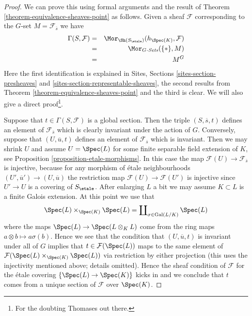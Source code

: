 \begin{proof}
We can prove this using formal arguments and the result of
Theorem \ref{theorem-equivalence-sheaves-point}
as follows. Given a sheaf $\mathcal{F}$ corresponding to
the $G$-set $M = \mathcal{F}_{\overline{s}}$ we have
\begin{eqnarray*}
\Gamma(S, \mathcal{F}) & = &
\Mor_{\Sh(S_\etale)}(h_{\Spec(K)},  \mathcal{F})
\\
& = & \Mor_{G\textit{-Sets}}(\{*\}, M) \\
& = & M^G
\end{eqnarray*}
Here the first identification is explained in
Sites, Sections \ref{sites-section-presheaves} and
\ref{sites-section-representable-sheaves},
the second results from
Theorem \ref{theorem-equivalence-sheaves-point}
and the third is clear. We will also give a direct proof\footnote{For
the doubting Thomases out there.}.

\medskip\noindent
Suppose that $t \in \Gamma(S, \mathcal{F})$ is a global section.
Then the triple $(S, \overline{s}, t)$ defines an element of
$\mathcal{F}_{\overline{s}}$ which is clearly invariant under the
action of $G$. Conversely, suppose that $(U, \overline{u}, t)$
defines an element of $\mathcal{F}_{\overline{s}}$ which is invariant.
Then we may shrink $U$ and assume $U = \Spec(L)$ for some
finite separable field extension of $K$, see
Proposition \ref{proposition-etale-morphisms}.
In this case the map $\mathcal{F}(U) \to \mathcal{F}_{\overline{s}}$
is injective, because for any morphism of \'etale neighbourhoods
$(U', \overline{u}') \to (U, \overline{u})$ the restriction map
$\mathcal{F}(U) \to \mathcal{F}(U')$ is injective since $U' \to U$
is a covering of $S_\etale$.
After enlarging $L$ a bit we may assume $K \subset L$ is a finite
Galois extension. At this point we use that
$$
\Spec(L) \times_{\Spec(K)} \Spec(L)
=
\coprod\nolimits_{\sigma \in \text{Gal}(L/K)} \Spec(L)
$$
where the maps $\Spec(L) \to \Spec(L \otimes_K L)$
come from the ring maps $a \otimes b \mapsto a\sigma(b)$. Hence we
see that the condition that $(U, \overline{u}, t)$ is invariant
under all of $G$ implies that $t \in \mathcal{F}(\Spec(L))$
maps to the same element of
$\mathcal{F}(\Spec(L) \times_{\Spec(K)} \Spec(L))$
via restriction by either projection (this uses the injectivity mentioned
above; details omitted). Hence the sheaf condition of $\mathcal{F}$
for the \'etale covering $\{\Spec(L) \to \Spec(K)\}$ kicks
in and we conclude that $t$ comes from a unique section of $\mathcal{F}$
over $\Spec(K)$.
\end{proof}

